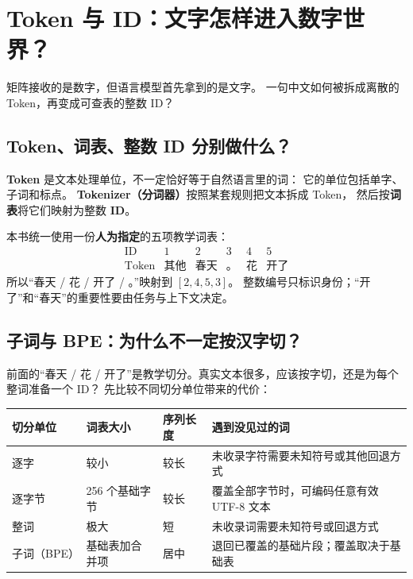 \chapterrule
\section{Token 与 ID：文字怎样进入数字世界？}
\label{intro:20a-tokenizer}

\label{concept:token}

矩阵接收的是数字，但语言模型首先拿到的是文字。
一句中文如何被拆成离散的 Token，再变成可查表的整数 ID？

\subsection{Token、词表、整数 ID 分别做什么？}
\label{concept:vocabulary}

\textbf{Token} 是文本处理单位，不一定恰好等于自然语言里的词：
它的单位包括单字、子词和标点。
\textbf{Tokenizer（分词器）}按照某套规则把文本拆成 Token，
然后按\textbf{词表}将它们映射为整数 \textbf{ID}。

本书统一使用一份\textbf{人为指定}的五项教学词表：
\[
\begin{array}{c|ccccc}
\text{ID}&1&2&3&4&5\\\hline
\text{Token}&\text{其他}&\text{春天}&\text{。}&\text{花}&\text{开了}
\end{array}
\]
所以“春天 / 花 / 开了 / 。”映射到 $[2,4,5,3]$。
整数编号只标识身份；“开了”和“春天”的重要性要由任务与上下文决定。

\subsection{子词与 BPE：为什么不一定按汉字切？}
\label{concept:bpe}

前面的“春天 / 花 / 开了”是教学切分。真实文本很多，应该按字切，还是为每个整词准备一个 ID？
先比较不同切分单位带来的代价：
\begin{center}\small
{}
\begin{tabularx}{\linewidth}{@{}p{24mm}p{30mm}p{18mm}X@{}}
\toprule
切分单位 & 词表大小 & 序列长度 & 遇到没见过的词\\\midrule
逐字 & 较小 & 较长 & 未收录字符需要未知符号或其他回退方式\\
逐字节 & 256 个基础字节 & 较长 & 覆盖全部字节时，可编码任意有效 UTF-8 文本\\
整词 & 极大 & 短 & 未收录词需要未知符号或回退方式\\
子词（BPE） & 基础表加合并项 & 居中 & 退回已覆盖的基础片段；覆盖取决于基础表\\
\bottomrule
\end{tabularx}
\end{center}

